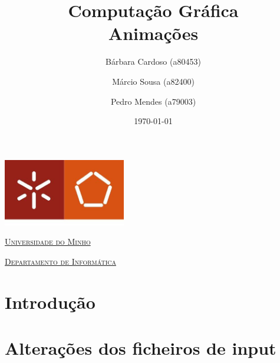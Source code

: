 \documentclass[a4paper]{article}
\begin{document}
\title{Computação Gráfica\\ Animações}
\author{Bárbara Cardoso (a80453) \and Márcio Sousa (a82400) \and Pedro Mendes (a79003)}
\date{\today}

\begin{titlepage}

    \thispagestyle{empty}
    \begin{center}
        \begin{minipage}{0.75\linewidth}
            \centering
            \includegraphics[width=0.4\textwidth]{eng.jpeg}\par\vspace{1cm}
            \vspace{1.5cm}
            \href{https://www.uminho.pt/PT}{\scshape\LARGE Universidade do Minho} \par
            \vspace{1cm}
            \href{https://www.di.uminho.pt/}{\scshape\Large Departamento de Informática} \par
            \vspace{1.5cm}

            \maketitle
        \end{minipage}
    \end{center}

\end{titlepage}

\tableofcontents

\pagebreak

\section{Introdução}


\section{Alterações dos ficheiros de input}\label{sec:estrutura-ficheiros}
\end{document}
